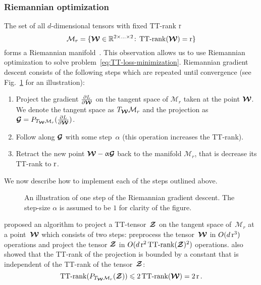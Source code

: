 \subsubsection{Riemannian optimization \label{sec:riemannian-optimization}}
The set of all $d$-dimensional tensors with fixed TT-rank $\operatorname{r}$
\begin{equation*}
\mathcal{M}_r = \{\boldsymbol{\mathcal{W}} \in \mathbb{R}^{2 \times  \ldots \times 2}\!:\, \operatorname{TT-rank}(\boldsymbol{\mathcal{W}})=\operatorname{r}\}
\end{equation*}
forms a Riemannian manifold~\cite{holtz2012manifolds}.
This observation allows us to use Riemannian optimization to solve problem~\eqref{eq:TT-loss-minimization}.
Riemannian gradient descent consists of the following steps which are repeated until convergence (see Fig.~\ref{fig:riemannian-illustration} for an illustration):
\begin{enumerate}
\item Project the gradient $\frac{\partial L}{\partial \boldsymbol{\mathcal{W}}}$ on the tangent space of $\mathcal{M}_r$ taken at the point $\boldsymbol{\mathcal{W}}$. We denote the tangent space as $T_{\boldsymbol{\mathcal{W}}} \mathcal{M}_r$ and the projection as $\boldsymbol{\mathcal{G}} = P_{T_{\boldsymbol{\mathcal{W}}} \mathcal{M}_r}(\frac{\partial L}{\partial \boldsymbol{\mathcal{W}}})$.
\item Follow along $\boldsymbol{\mathcal{G}}$ with some step~$\alpha$ (this operation increases the TT-rank).
\item Retract the new point $\boldsymbol{\mathcal{W}} - \upalpha \boldsymbol{\mathcal{G}}$ back to the manifold $\mathcal{M}_r$, that is decrease its TT-rank to $\operatorname{r}$.
\end{enumerate}
We now describe how to implement each of the steps outlined above.

\begin{figure}[t]
\begin{center}
  \resizebox{0.3\textwidth}{!}{
  \def\svgwidth{7cm}
  \normalsize
  
  }
  \caption{An illustration of one step of the Riemannian gradient descent. The step-size $\alpha$ is assumed to be $1$ for clarity of the figure. \label{fig:riemannian-illustration}}
  \end{center}
\end{figure}

\cite{lubich2015time} proposed an algorithm to project a TT-tensor~$\boldsymbol{\mathcal{Z}}$ on the tangent space of~$\mathcal{M}_r$ at a point~$\boldsymbol{\mathcal{W}}$ which consists of two steps: preprocess the tensor~$\boldsymbol{\mathcal{W}}$ in $O(d \operatorname{r}^3)$ operations and project the tensor $\boldsymbol{\mathcal{Z}}$ in $O(d \operatorname{r}^2 \operatorname{TT-rank}(\boldsymbol{\mathcal{Z}})^2)$ operations.
\cite{lubich2015time} also showed that the TT-rank of the projection is bounded by a constant that is independent of the TT-rank of the tensor~$\boldsymbol{\mathcal{Z}}$:
\begin{equation*}
   \operatorname{TT-rank}(P_{T_{\boldsymbol{\mathcal{W}}} \mathcal{M}_r}(\boldsymbol{\mathcal{Z}})) \leqslant 2 \operatorname{TT-rank}(\boldsymbol{\mathcal{W}}) = 2 \operatorname{r}.
\end{equation*}

